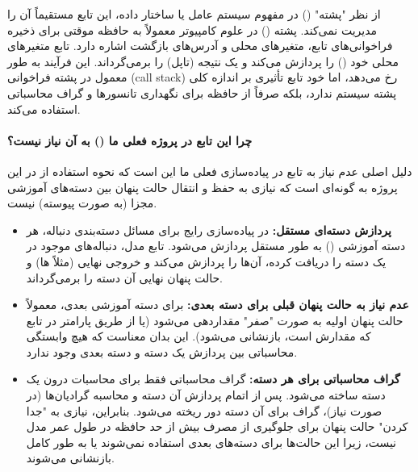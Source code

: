 \documentclass{article}
\begin{document}
از نظر "پشته" () در مفهوم سیستم عامل یا ساختار داده، این تابع مستقیماً آن را مدیریت نمی‌کند. پشته () در علوم کامپیوتر معمولاً به حافظه موقتی برای ذخیره فراخوانی‌های تابع، متغیرهای محلی و آدرس‌های بازگشت اشاره دارد. تابع  متغیرهای محلی خود () را پردازش می‌کند و یک نتیجه (تاپل) را برمی‌گرداند. این فرآیند به طور معمول در پشته فراخوانی (call stack) رخ می‌دهد، اما خود تابع تأثیری بر اندازه کلی پشته سیستم ندارد، بلکه صرفاً از حافظه  برای نگهداری تانسورها و گراف محاسباتی استفاده می‌کند.

\paragraph{چرا این تابع در پروژه فعلی ما () به آن نیاز نیست؟}
دلیل اصلی عدم نیاز به تابع  در پیاده‌سازی فعلی ما این است که نحوه استفاده از  در این پروژه به گونه‌ای است که نیازی به حفظ و انتقال حالت پنهان بین دسته‌های آموزشی مجزا (به صورت پیوسته) نیست.
\begin{itemize}
	\item \textbf{پردازش دسته‌ای مستقل:} در پیاده‌سازی رایج  برای مسائل دسته‌بندی دنباله، هر دسته آموزشی () به طور مستقل پردازش می‌شود. تابع  مدل، دنباله‌های موجود در یک دسته را دریافت کرده، آن‌ها را پردازش می‌کند و خروجی نهایی (مثلاً  ها) و حالت پنهان نهایی آن دسته را برمی‌گرداند.
	\item \textbf{عدم نیاز به حالت پنهان قبلی برای دسته بعدی:} برای دسته آموزشی بعدی، معمولاً حالت پنهان اولیه به صورت "صفر" مقداردهی می‌شود (یا از طریق پارامتر  در تابع  که مقدارش  است، بازنشانی می‌شود). این بدان معناست که هیچ وابستگی محاسباتی بین پردازش یک دسته و دسته بعدی وجود ندارد.
	\item \textbf{گراف محاسباتی برای هر دسته:} گراف محاسباتی فقط برای محاسبات درون یک دسته ساخته می‌شود. پس از اتمام پردازش آن دسته و محاسبه گرادیان‌ها (در صورت نیاز)، گراف برای آن دسته دور ریخته می‌شود. بنابراین، نیازی به "جدا کردن" حالت پنهان برای جلوگیری از مصرف بیش از حد حافظه در طول عمر مدل نیست، زیرا این حالت‌ها برای دسته‌های بعدی استفاده نمی‌شوند یا به طور کامل بازنشانی می‌شوند.
\end{itemize}
\end{document}
